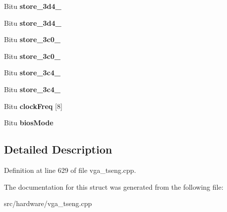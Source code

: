 \begin{DoxyCompactItemize}
\item 
\hypertarget{structSVGA__ET3K__DATA_a3d6626384c671feeede9375bb45ad6cf}{Bitu {\bfseries store\-\_\-3d4\-\_}}\label{structSVGA__ET3K__DATA_a3d6626384c671feeede9375bb45ad6cf}

\item 
\hypertarget{structSVGA__ET3K__DATA_ab1dd50235ef39aa09c4ded3eb832e5fa}{Bitu {\bfseries store\-\_\-3d4\-\_}}\label{structSVGA__ET3K__DATA_ab1dd50235ef39aa09c4ded3eb832e5fa}

\item 
\hypertarget{structSVGA__ET3K__DATA_a97cf442e5e9b0b90e03575d81a3aae79}{Bitu {\bfseries store\-\_\-3c0\-\_}}\label{structSVGA__ET3K__DATA_a97cf442e5e9b0b90e03575d81a3aae79}

\item 
\hypertarget{structSVGA__ET3K__DATA_a9fa835747953f5e4e902633b73bc3e85}{Bitu {\bfseries store\-\_\-3c0\-\_}}\label{structSVGA__ET3K__DATA_a9fa835747953f5e4e902633b73bc3e85}

\item 
\hypertarget{structSVGA__ET3K__DATA_aeaedb6e1c9092b279657d5f91fea47b1}{Bitu {\bfseries store\-\_\-3c4\-\_}}\label{structSVGA__ET3K__DATA_aeaedb6e1c9092b279657d5f91fea47b1}

\item 
\hypertarget{structSVGA__ET3K__DATA_ac500854ef142ca0216542d6d763f75b8}{Bitu {\bfseries store\-\_\-3c4\-\_}}\label{structSVGA__ET3K__DATA_ac500854ef142ca0216542d6d763f75b8}

\item 
\hypertarget{structSVGA__ET3K__DATA_a91bf3ec1d0b94b359a2465076a604bfc}{Bitu {\bfseries clock\-Freq} \mbox{[}8\mbox{]}}\label{structSVGA__ET3K__DATA_a91bf3ec1d0b94b359a2465076a604bfc}

\item 
\hypertarget{structSVGA__ET3K__DATA_ac51787ec5154f04d1d84e714f262d284}{Bitu {\bfseries bios\-Mode}}\label{structSVGA__ET3K__DATA_ac51787ec5154f04d1d84e714f262d284}

\end{DoxyCompactItemize}


\subsection{Detailed Description}


Definition at line 629 of file vga\-\_\-tseng.\-cpp.



The documentation for this struct was generated from the following file\-:\begin{DoxyCompactItemize}
\item 
src/hardware/vga\-\_\-tseng.\-cpp\end{DoxyCompactItemize}
